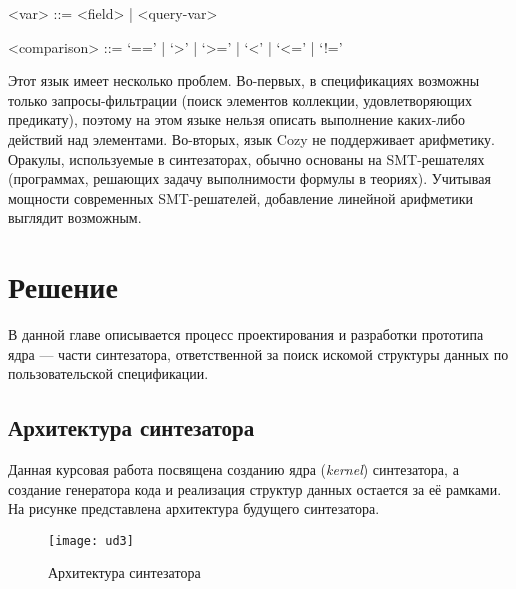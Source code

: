 \documentclass[14pt]{matmex-diploma-custom}
\begin{document}
\begin{grammar}
<var> ::= <field> | <query-var>
\end{grammar}

\begin{grammar}
<comparison> ::= `==' | `>' | `>=' | `<' | `<=' | `!='
\end{grammar}
Этот язык имеет несколько проблем. Во-первых, в спецификациях возможны только запросы-фильтрации (поиск элементов коллекции, удовлетворяющих предикату), поэтому на этом языке нельзя описать выполнение каких-либо действий над элементами. Во-вторых, язык Cozy не поддерживает арифметику. Оракулы, используемые в синтезаторах, обычно основаны на SMT-решателях (программах, решающих задачу выполнимости формулы в теориях). Учитывая мощности современных SMT-решателей, добавление линейной арифметики выглядит возможным.




\section{Решение}
В данной главе описывается процесс проектирования и разработки прототипа ядра --- части синтезатора, ответственной за поиск искомой структуры данных по пользовательской спецификации.

\subsection{Архитектура синтезатора}
Данная курсовая работа посвящена созданию ядра (\textit{kernel}) синтезатора, а создание генератора кода и реализация структур данных остается за её рамками. На рисунке представлена архитектура будущего синтезатора.
\begin{figure}[h]
\caption{Архитектура синтезатора}
\centering
\texttt{[image: ud3]}
\end{figure}
\end{document}
